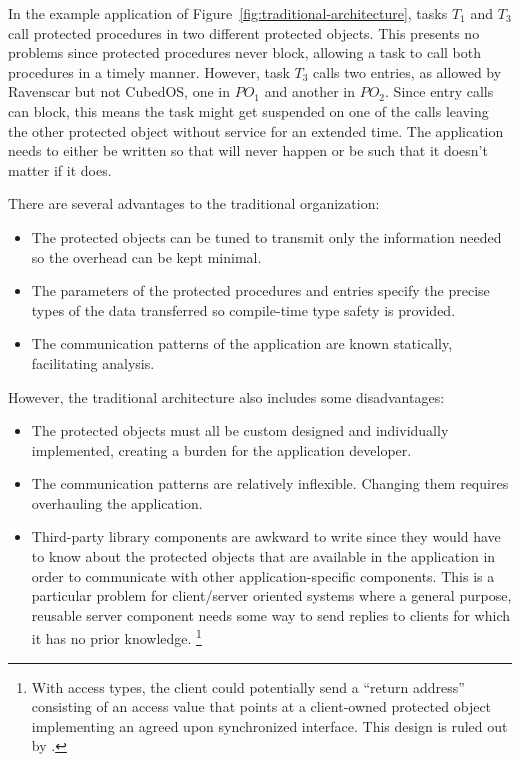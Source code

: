In the example application of Figure~\ref{fig:traditional-architecture}, tasks $T_1$ and $T_3$
call protected procedures in two different protected objects. This presents no problems since
protected procedures never block, allowing a task to call both procedures in a timely manner.
However, task $T_3$ calls two entries, as allowed by Ravenscar but not CubedOS, one in $PO_1$
and another in $PO_2$. Since entry calls can block, this means the task might get suspended on
one of the calls leaving the other protected object without service for an extended time. The
application needs to either be written so that will never happen or be such that it doesn't
matter if it does.

There are several advantages to the traditional organization:

\begin{itemize}
\item The protected objects can be tuned to transmit only the information needed so the overhead
  can be kept minimal.
\item The parameters of the protected procedures and entries specify the precise types of the
  data transferred so compile-time type safety is provided.
\item The communication patterns of the application are known statically, facilitating analysis.
\end{itemize}

However, the traditional architecture also includes some disadvantages:

\begin{itemize}
\item The protected objects must all be custom designed and individually implemented, creating a
  burden for the application developer.
\item The communication patterns are relatively inflexible. Changing them requires overhauling
  the application.
\item Third-party library components are awkward to write since they would have to know about
  the protected objects that are available in the application in order to communicate with other
  application-specific components. This is a particular problem for client/server oriented
  systems where a general purpose, reusable server component needs some way to send replies to
  clients for which it has no prior knowledge. \footnote{With access types, the client could
    potentially send a ``return address'' consisting of an access value that points at a
    client-owned protected object implementing an agreed upon synchronized interface. This design
    is ruled out by \SPARK.}
\end{itemize}

